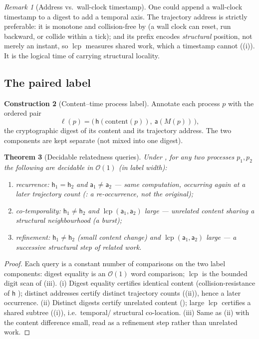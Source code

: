 \documentclass[twocolumn,10pt,a4paper]{article}
\theoremstyle{thmstyle}
\newtheorem{theorem}{Theorem}[section]
\theoremstyle{definition}
\newtheorem{construction}[theorem]{Construction}
\theoremstyle{remark}
\newtheorem{remark}[theorem]{Remark}
\newcommand{\Mcount}{M}
\newcommand{\Addr}{\mathsf{a}}
\newcommand{\dig}{\mathsf{h}}
\newcommand{\lab}{\ell}
\DeclareMathOperator{\lcp}{lcp}
\begin{document}
\begin{remark}[Address vs.\ wall-clock timestamp]
\label{rem:vs-timestamp}
One could append a wall-clock timestamp to a digest to add a temporal
axis. The trajectory address is strictly preferable: it is monotone and
collision-free by  (a wall clock can reset, run
backward, or collide within a tick); and its prefix encodes
\emph{structural} position, not merely an instant, so $\lcp$ measures
shared work, which a timestamp cannot
((i)). It is the logical time of
\citep{lamport1978,fidge1988,mattern1989} carrying structural locality.
\end{remark}

\subsection{The paired label}

\begin{construction}[Content--time process label]
\label{con:paired}
Annotate each process $p$ with the ordered pair
\[
\lab(p)=\big(\,\dig(\mathrm{content}(p)),\ \Addr(\Mcount(p))\,\big),
\]
the cryptographic digest of its content and its trajectory address. The
two components are kept separate (not mixed into one digest).
\end{construction}

\begin{theorem}[Decidable relatedness queries]
\label{thm:queries}
Under , for any two processes $p_1,p_2$ the following are
decidable in $\mathcal{O}(1)$ (in label width):
\begin{enumerate}[label=\textup{(\roman*)},leftmargin=2.2em,itemsep=2pt]
\item \emph{recurrence:} $\dig_1=\dig_2$ and $\Addr_1\neq\Addr_2$ ---
same computation, occurring again at a later trajectory count
(: a re-occurrence, not the original);
\item \emph{co-temporality:} $\dig_1\neq\dig_2$ and
$\lcp(\Addr_1,\Addr_2)$ large --- unrelated content sharing a structural
neighbourhood (a burst);
\item \emph{refinement:} $\dig_1\neq\dig_2$ (small content change) and
$\lcp(\Addr_1,\Addr_2)$ large --- a successive structural step of related
work.
\end{enumerate}
\end{theorem}

\begin{proof}
Each query is a constant number of comparisons on the two label
components: digest equality is an $\mathcal{O}(1)$ word comparison;
$\lcp$ is the bounded digit scan of (iii). (i) Digest
equality certifies identical content (collision-resistance of $\dig$
\citep{nist180-4,stevens2017}); distinct addresses certify distinct
trajectory counts ((ii)), hence a later occurrence. (ii)
Distinct digests certify unrelated content (); large
$\lcp$ certifies a shared subtree ((i)), i.e.\ temporal/%
structural co-location. (iii) Same as (ii) with the content difference
small, read as a refinement step rather than unrelated work.
\end{proof}
\end{document}
